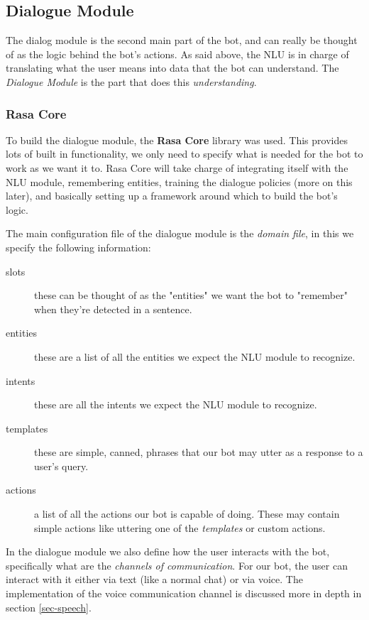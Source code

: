 \documentclass[11pt,a4paper]{article}
\begin{document}
	\subsection{Dialogue Module}
	\label{ssec-dialogue-module}
		
		The dialog module is the second main part of the bot, and can really be thought of as the logic behind the bot's actions. As said above, the NLU is in charge of translating what the user means into data that the bot can understand. The \textit{Dialogue Module} is the part that does this \textit{understanding}.
		
		\subsubsection{Rasa Core}
		\label{ssec-rasa-core}	
		
			To build the dialogue module, the \textbf{Rasa Core} \cite{rasacore} library was used. This provides lots of built in functionality, we only need to specify what is needed for the bot to work as we want it to. Rasa Core will take charge of integrating itself with the NLU module, remembering entities, training the dialogue policies (more on this later), and basically setting up a framework around which to build the bot's logic. 
			
			The main configuration file of the dialogue module is the \textit{domain file}, in this we specify the following information:
			
			\begin{description}
				\item[slots] these can be thought of as the "entities" we want the bot to "remember" when they're detected in a sentence.
				\item[entities] these are a list of all the entities we expect the NLU module to recognize.
				\item[intents] these are all the intents we expect the NLU module to recognize.
				\item[templates] these are simple, canned, phrases that our bot may utter as a response to a user's query.
				\item[actions] a list of all the actions our bot is capable of doing. These may contain simple actions like uttering one of the \textit{templates} or custom actions.
			\end{description}
			
			In the dialogue module we also define how the user interacts with the bot, specifically what are the \textit{channels of communication}. For our bot, the user can interact with it either via text (like a normal chat) or via voice. The implementation of the voice communication channel is discussed more in depth in section \ref{sec-speech}.
			
\end{document}
